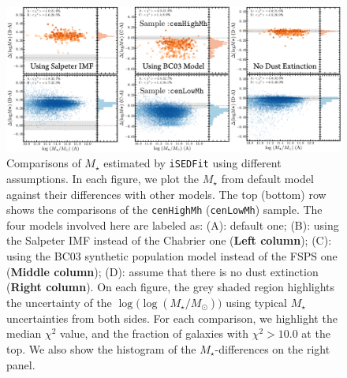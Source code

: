 \documentclass[a4paper,fleqn,usenatbib]{mnras}
\def\rbcg{\texttt{cenHighMh}}
\def\nbcg{\texttt{cenLowMh}}
\def\mstar{{$M_{\star}$}}
\def\logms{{$\log (M_{\star}/M_{\odot})$}}
\begin{document}
    \begin{figure}
        \begin{center}
        \includegraphics[width=\textwidth]{fig/redbcg_isedfit_3.pdf}
        \caption{
            Comparisons of \mstar{} estimated by \texttt{iSEDFit} using different
            assumptions. 
            In each figure, we plot the \mstar{} from default model against their 
            differences with other models. 
            The top (bottom) row shows the comparisons of the \rbcg{} (\nbcg{}) sample. 
            The four models involved here are labeled as: 
            (A): default one; 
            (B): using the Salpeter IMF instead of the Chabrier one 
                (\textbf{Left column});
            (C): using the BC03 synthetic population model instead of the FSPS one
                (\textbf{Middle column});
            (D): assume that there is no dust extinction (\textbf{Right column}). 
            On each figure, the grey shaded region highlights the uncertainty 
            of the $\log($\logms{}$)$ using typical \mstar{} uncertainties from 
            both sides. 
            For each comparison, we highlight the median $\chi^{2}$ value, and the fraction
            of galaxies with $\chi^{2} > 10.0$ at the top. 
            We also show the histogram of the \mstar{}-differences on the right panel.
            }
        \label{fig:ised_3}
        \end{center}
    \end{figure}

 
\end{document}

